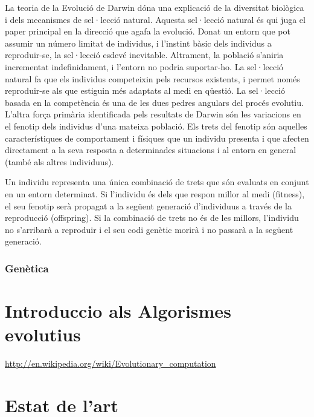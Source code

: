 La teoria de la Evolució de Darwin \cite{Darwin} dóna una explicació de la
diversitat biològica i dels mecanismes de sel·lecció natural.  Aquesta
sel·lecció natural és qui juga el paper principal en la direcció que agafa la
evolució.  Donat un entorn que pot assumir un número limitat de individus, i
l'instint bàsic dels individus a reproduir-se, la sel·lecció esdevé inevitable.
Altrament, la població s'aniria incrementat indefinidament, i l'entorn no podria
suportar-ho.  La sel·lecció natural fa que els individus competeixin pels
recursos existents, i permet només reproduir-se als que estiguin més adaptats al
medi en qüestió.  La sel·lecció basada en la competència és una de les dues
pedres angulars del procés evolutiu.  L'altra força primària identificada pels
resultats de Darwin són les variacions en el fenotip dels individus d'una
mateixa població. Els trets del fenotip són aquelles característiques de
comportament i físiques que un individu presenta i que afecten directament a la
seva resposta a determinades situacions i al entorn en general (també als altres
individuus).

Un individu representa una única combinació de trets que són evaluats en conjunt
en un entorn determinat.  Si l'individu és dels que respon millor al medi
(fitness), el seu fenotip serà propagat a la següent generació d'individuus a
través de la reproducció (offspring).  Si la combinació de trets no és de les
millors, l'individu no s'arribarà a reproduir i el seu codi genètic morirà i no
passarà a la següent generació.

\subsubsection{Genètica} %
\label{ssub:Genetica}




\section{Introduccio als Algorismes evolutius} %
\label{sec:Introduccio als AE}

\url{http://en.wikipedia.org/wiki/Evolutionary\_computation}



\section{Estat de l'art} %
\label{sec:Estat de l'art}

